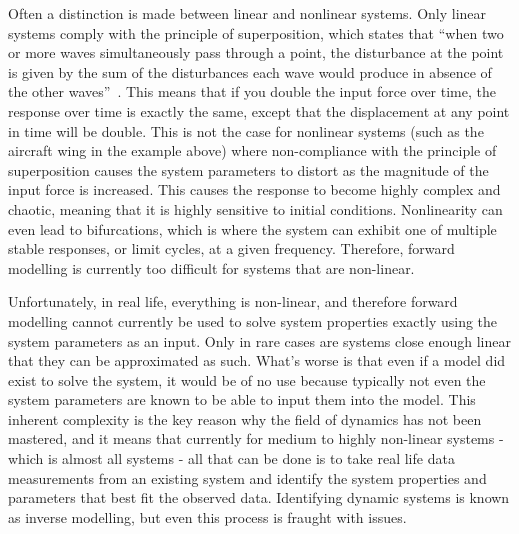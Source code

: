 \documentclass[12pt]{article}
\begin{document}
    Often a distinction is made between linear and nonlinear systems.
    Only linear systems comply with the principle of superposition, which states that ``when two or more waves simultaneously pass through a point, the disturbance at the point is given by the sum of the disturbances each wave would produce in absence of the other waves''~\cite{StudyComSuperposition}.
    This means that if you double the input force over time, the response over time is exactly the same, except that the displacement at any point in time will be double.
    This is not the case for nonlinear systems (such as the aircraft wing in the example above) where non-compliance with the principle of superposition causes the system parameters to distort as the magnitude of the input force is increased.
    This causes the response to become highly complex and chaotic, meaning that it is highly sensitive to initial conditions.
    Nonlinearity can even lead to bifurcations, which is where the system can exhibit one of multiple stable responses, or limit cycles, at a given frequency.
    Therefore, forward modelling is currently too difficult for systems that are non-linear.

    Unfortunately, in real life, everything is non-linear, and therefore forward modelling cannot currently be used to solve system properties exactly using the system parameters as an input.
    Only in rare cases are systems close enough linear that they can be approximated as such.
    What's worse is that even if a model did exist to solve the system, it would be of no use because typically not even the system parameters are known to be able to input them into the model.
    This inherent complexity is the key reason why the field of dynamics has not been mastered, and it means that currently for medium to highly non-linear systems - which is almost all systems - all that can be done is to take real life data measurements from an existing system and identify the system properties and parameters that best fit the observed data.
    Identifying dynamic systems is known as inverse modelling, but even this process is fraught with issues.
\end{document}
